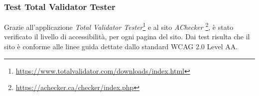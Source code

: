 \subsubsection{Test Total Validator Tester}
Grazie all'applicazione  \textit{Total Validator Tester}\footnote{\url{https://www.totalvalidator.com/downloads/index.html}} e al sito \textit{AChecker} \footnote{\url{https://achecker.ca/checker/index.php}}, è stato verificato il livello di accessibilità, per ogni pagina del sito. Dai test risulta che il sito è conforme alle linee guida dettate dallo standard WCAG 2.0 Level AA.
